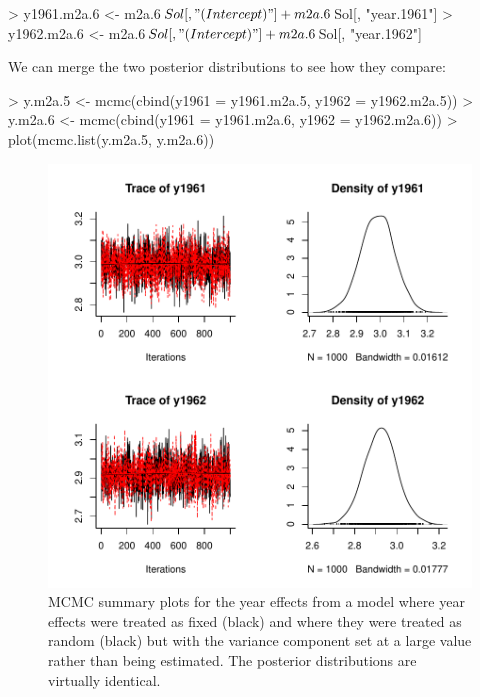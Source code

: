 \documentclass{article}
\begin{document}
\begin{Schunk}
\begin{Sinput}
> y1961.m2a.6 <- m2a.6$Sol[, "(Intercept)"] + m2a.6$Sol[, "year.1961"]
> y1962.m2a.6 <- m2a.6$Sol[, "(Intercept)"] + m2a.6$Sol[, "year.1962"]
\end{Sinput}
\end{Schunk}

We can merge the two posterior distributions to see how they compare:

\begin{Schunk}
\begin{Sinput}
> y.m2a.5 <- mcmc(cbind(y1961 = y1961.m2a.5, y1962 = y1962.m2a.5))
> y.m2a.6 <- mcmc(cbind(y1961 = y1961.m2a.6, y1962 = y1962.m2a.6))
> plot(mcmc.list(y.m2a.5, y.m2a.6))
\end{Sinput}
\end{Schunk}


\begin{figure}[!h]
\begin{center}
\includegraphics{Lecture2-050}
\end{center}
\caption{MCMC summary plots for the year effects from a model where year effects were treated as fixed (black) and where they were treated as random (black) but with the variance component set at a large value rather than being estimated. The posterior distributions are virtually identical.}
\label{y.pred-fig}
\end{figure}
\end{document}
